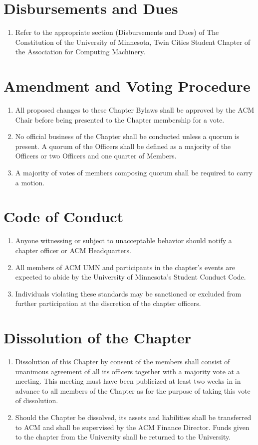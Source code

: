 \section{Disbursements and Dues}
\begin{enumerate}
	\item Refer to the appropriate section (Disbursements and Dues) of The Constitution of the University of Minnesota, Twin Cities Student Chapter of the Association for Computing Machinery.
\end{enumerate}

\section{Amendment and Voting Procedure}
\begin{enumerate}
	\item All proposed changes to these Chapter Bylaws shall be approved by the ACM Chair before being presented to the Chapter membership for a vote.
	\item No official business of the Chapter shall be conducted unless a quorum is present. A quorum of the Officers shall be defined as a majority of the Officers or two Officers and one quarter of Members.
	\item A majority of votes of members composing quorum shall be required to carry a motion.
\end{enumerate}

\section{Code of Conduct}
\begin{enumerate}
	\item Anyone witnessing or subject to unacceptable behavior should notify a chapter officer or ACM Headquarters.
	\item All members of ACM UMN and participants in the chapter’s events are expected to abide by the University of Minnesota’s Student Conduct Code.
	\item Individuals violating these standards may be sanctioned or excluded from further participation at the discretion of the chapter officers.
\end{enumerate}

\section{Dissolution of the Chapter}
\begin{enumerate}
	\item Dissolution of this Chapter by consent of the members shall consist of unanimous agreement of all its officers together with a majority vote at a meeting. This meeting must have been publicized at least two weeks in in advance to all members of the Chapter as for the purpose of taking this vote of dissolution.
	\item Should the Chapter be dissolved, its assets and liabilities shall be transferred to ACM and shall be supervised by the ACM Finance Director.  Funds given to the chapter from the University shall be returned to the University.
\end{enumerate}



